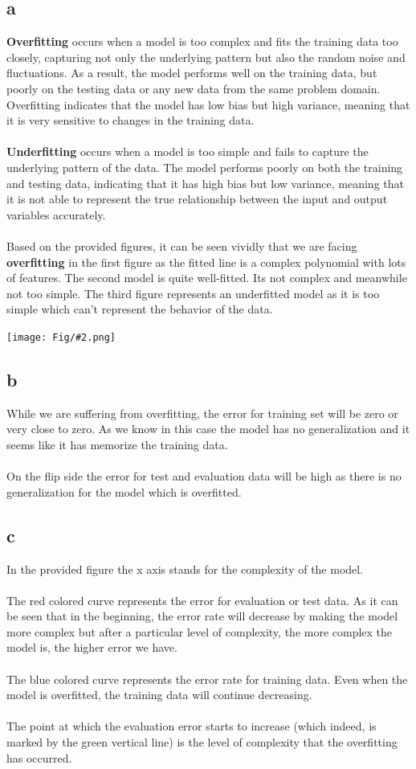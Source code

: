 \documentclass[]{article}
\newcommand{\pict}[2]{\begin{center}
		\texttt{[image: Fig/\#2.png]}
\end{center}}
\begin{document}
	\subsection*{a}
	\textbf{Overfitting} occurs when a model is too complex and fits the training data too closely, capturing not only the underlying pattern but also the random noise and fluctuations. As a result, the model performs well on the training data, but poorly on the testing data or any new data from the same problem domain. Overfitting indicates that the model has low bias but high variance, meaning that it is very sensitive to changes in the training data.\\\\
	\textbf{Underfitting} occurs when a model is too simple and fails to capture the underlying pattern of the data. The model performs poorly on both the training and testing data, indicating that it has high bias but low variance, meaning that it is not able to represent the true relationship between the input and output variables accurately.\\\\
	Based on the provided figures, it can be seen vividly that we are facing \textbf{overfitting} in the first figure as the fitted line is a complex polynomial with lots of features. The second model is quite well-fitted. Its not complex and meanwhile not too simple. The third figure represents an underfitted model as it is too simple which can't represent the behavior of the data.
	\pict{0.7}{F3} 
	
	\subsection*{b}
	While we are suffering from overfitting, the error for training set will be zero or very close to zero. As we know in this case the model has no generalization and it seems like it has memorize the training data. \\\\
	On the flip side the error for test and evaluation data will be high as there is no generalization for the model which is overfitted.
	
	\subsection*{c}
	In the provided figure the x axis stands for the complexity of the model.\\\\
	The red colored curve represents the error for evaluation or test data. As it can be seen that in the beginning, the error rate will decrease by making the model more complex but after a particular level of complexity, the more complex the model is, the higher error we have.\\\\
	The blue colored curve represents the error rate for training data. Even when the model is overfitted, the training data will continue decreasing.\\\\
	The point at which the evaluation error starts to increase (which indeed, is marked by the green vertical line) is the level of complexity that the overfitting has occurred.
	
\end{document}
